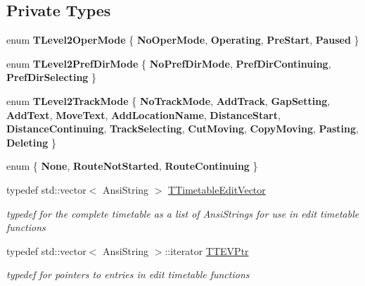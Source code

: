 \subsection*{Private Types}
\begin{DoxyCompactItemize}
\item 
\mbox{\label{class_t_interface_a27907322ad578367c81cae9cf2e5f949}} 
enum {\bfseries T\+Level2\+Oper\+Mode} \{ {\bfseries No\+Oper\+Mode}, 
{\bfseries Operating}, 
{\bfseries Pre\+Start}, 
{\bfseries Paused}
 \}
\item 
\mbox{\label{class_t_interface_a6193184bbbcd9cd3c0cf7407ab43f7bb}} 
enum {\bfseries T\+Level2\+Pref\+Dir\+Mode} \{ {\bfseries No\+Pref\+Dir\+Mode}, 
{\bfseries Pref\+Dir\+Continuing}, 
{\bfseries Pref\+Dir\+Selecting}
 \}
\item 
\mbox{\label{class_t_interface_a586c3aa182a227b9fcf8ec298ba139d7}} 
enum {\bfseries T\+Level2\+Track\+Mode} \{ \newline
{\bfseries No\+Track\+Mode}, 
{\bfseries Add\+Track}, 
{\bfseries Gap\+Setting}, 
{\bfseries Add\+Text}, 
\newline
{\bfseries Move\+Text}, 
{\bfseries Add\+Location\+Name}, 
{\bfseries Distance\+Start}, 
{\bfseries Distance\+Continuing}, 
\newline
{\bfseries Track\+Selecting}, 
{\bfseries Cut\+Moving}, 
{\bfseries Copy\+Moving}, 
{\bfseries Pasting}, 
\newline
{\bfseries Deleting}
 \}
\item 
\mbox{\label{class_t_interface_a015fd973ab8116d1f616f5455e5e7c99}} 
enum \{ {\bfseries None}, 
{\bfseries Route\+Not\+Started}, 
{\bfseries Route\+Continuing}
 \}
\item 
\mbox{\label{class_t_interface_abf0434fbaa193f8f7594977f6e88f006}} 
typedef std\+::vector$<$ Ansi\+String $>$ \mbox{\hyperlink{class_t_interface_abf0434fbaa193f8f7594977f6e88f006}{T\+Timetable\+Edit\+Vector}}
\begin{DoxyCompactList}\small\item\em typedef for the complete timetable as a list of Ansi\+Strings for use in edit timetable functions \end{DoxyCompactList}\item 
\mbox{\label{class_t_interface_abea77d791c25726e7711356bbc902534}} 
typedef std\+::vector$<$ Ansi\+String $>$\+::iterator \mbox{\hyperlink{class_t_interface_abea77d791c25726e7711356bbc902534}{T\+T\+E\+V\+Ptr}}
\begin{DoxyCompactList}\small\item\em typedef for pointers to entries in edit timetable functions \end{DoxyCompactList}\end{DoxyCompactItemize}
